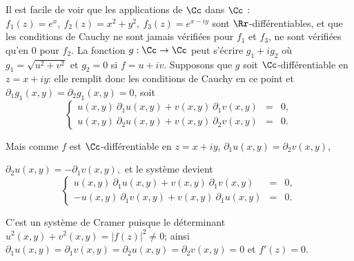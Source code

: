 {\begin{enumerate}
{Il est facile de voir que les applications de $\Cc$ dans
$\Cc$ : $f_1(z)=e^x,\ f_2(z)= x^2+y^2,\ f_3(z)=e^{x-iy}$ sont 
$\Rr$-différentiables, et que les conditions de Cauchy ne sont jamais vérifiées
pour $f_1$ et $f_3$, ne sont vérifiées qu'en $0$ pour $f_2$.
La fonction $g :\Cc\to\Cc$ peut s'écrire $g_1+ig_2$ où
$g_1=\sqrt{u^2+v^2}$ et $g_2=0$ si
$f=u+iv$. Supposons que $g$ soit 
$\Cc$-différentiable en $z=x+iy$: elle remplit donc les conditions de
Cauchy en ce point et $\partial_1g_1(x,y)=\partial_2g_1(x,y)=0$, soit
$$\left \{\begin{array}{ccc}
u(x,y)\ \partial_1u(x,y)+v(x,y)\ \partial_1v(x,y)&=&0,\\
u(x,y)\ \partial_2u(x,y)+v(x,y)\ \partial_2v(x,y)&=&0.
\end{array}\right.
$$

Mais comme $f$ est  
$\Cc$-différentiable en $z=x+iy$, $\partial_1u(x,y)=\partial_2v(x,y),$ 
 
$\partial_2u(x,y)=-\partial_1v(x,y),$ et le système devient
$$\left \{\begin{array}{ccc}
u(x,y)\ \partial_1u(x,y)+v(x,y)\ \partial_1v(x,y)&=&0,\\
-u(x,y)\ \partial_1v(x,y)+v(x,y)\ \partial_1u(x,y)&=&0.
\end{array}\right.
$$

C'est un système de Cramer puisque le déterminant
$u^2(x,y)+v^2(x,y)=|f(z)|^2\not=0$;
ainsi $\partial_1u(x,y)=\partial_1v(x,y)=\partial_2u(x,y)=\partial_2v(x,y)=0$ et
$f'(z)=0$.
}
\end{enumerate}
}
